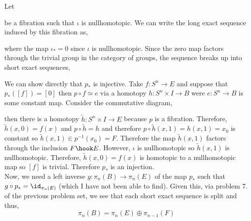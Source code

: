 \documentclass[12pt]{extarticle}
\begin{document}
Let 
\begin{center}
\end{center}
be a fibration such that $\iota$ is nullhomotopic. We can write the long exact sequence induced by this fibration as,
\begin{center}
\end{center}
where the map $\iota_* = 0$ since $\iota$ is nullhomotopic. Since the zero map factors through the trivial group in the category of groups, the sequence breaks up into short exact sequences,
\begin{center}
\end{center}
We can show directly that $p_*$ is injective.
Take $f : S^n \to E$ and suppose that $p_*([f]) = [0]$ then $p \circ f \simeq e$ via a homotopy $h : S^n \times I \to B$ were $e : S^n \to B$ is some constant map. Consider the commutative diagram,
\begin{center}
\end{center}
then there is a homotopy $\tilde{h} : S^n \times I \to E$ because $p$ is a fibration. Therefore, $\tilde{h}(x, 0) = f(x)$ and $p \circ \tilde{h} = h$ and therefore $p \circ \tilde{h}(x, 1) = h(x, 1) = x_0$ is constant so $\tilde{h}(x, 1) \in p^{-1}(x_0) = F$. Therefore the map $\tilde{h}(x,1)$ factors through the inclusion $F \hook E$. However, $\iota$ is nullhomotopic so $\tilde{h}(x,1)$ is nullhomotopic. Therefore, $\tilde{h}(x,0) = f(x)$ is homotopic to a nullhomotopic map so $[f]$ is trivial. Therefore $p_*$ is an injection. \bigskip\\
Now, we need a left inverse $g : \pi_n(B) \to \pi_n(E)$ of the map $p_*$ such that $g \circ p_* = \id_{\pi_n(E)}$ (which I have not been able to find). Given this, via problem 7. of the previous problem set, we see that each short exact sequence is split and thus,
\[ \pi_n(B) = \pi_n(E) \oplus \pi_{n-1}(F) \]
\end{document}
